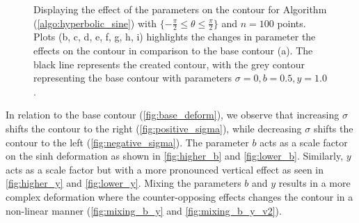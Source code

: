 \documentclass[a4paper]{report}
\begin{document}
\begin{figure}[H]
    \caption{Displaying the effect of the parameters on the contour for Algorithm (\ref{algo:hyperbolic_sine}) with $\{-\frac{\pi}{2} \leq \theta \leq \frac{\pi}{2} \}$ and $n = 100$ points. Plots (b, c, d, e, f, g, h, i) highlights the changes in parameter the effects on the contour in comparison to the base contour (a). The black line represents the created contour, with the grey contour representing the base contour with parameters $\sigma = 0, b = 0.5, y = 1.0$.}
    \label{fig:deforming_all}
\end{figure}

In relation to the base contour (\autoref{fig:base_deform}), we observe that increasing $\sigma$ shifts the contour to the right (\autoref{fig:positive_sigma}), while decreasing $\sigma$ shifts the contour to the left (\autoref{fig:negative_sigma}). The parameter $b$ acts as a scale factor on the sinh deformation as shown in \autoref{fig:higher_b} and \ref{fig:lower_b}. Similarly, $y$ acts as a scale factor but with a more pronounced vertical effect as seen in \autoref{fig:higher_y} and \ref{fig:lower_y}. Mixing the parameters $b$ and $y$ results in a more complex deformation where the counter-opposing effects changes the contour in a non-linear manner (\autoref{fig:mixing_b_y} and \ref{fig:mixing_b_y_v2}).
\end{document}
